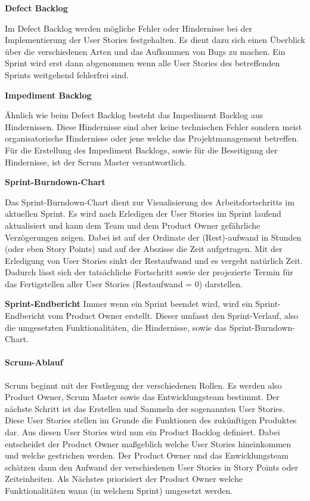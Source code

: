 \textbf{Defect Backlog}

Im Defect Backlog werden mögliche Fehler oder Hindernisse bei der Implementierung der User Stories festgehalten. Es dient dazu sich einen Überblick über die verschiedenen Arten und das Aufkommen von Bugs zu machen. Ein Sprint wird erst dann abgenommen wenn alle User Stories des betreffenden Sprints weitgehend fehlerfrei sind.

\textbf{Impediment Backlog}

Ähnlich wie beim Defect Backlog besteht das Impediment Backlog aus Hindernissen. Diese Hindernisse sind aber keine technischen Fehler sondern meist organisatorische Hindernisse oder jene welche das Projektmanagement betreffen. Für die Erstellung des Impediment Backlogs, sowie für die Beseitigung der Hindernisse, ist der Scrum Master verantwortlich.

\textbf{Sprint-Burndown-Chart}

Das Sprint-Burndown-Chart dient zur Visualisierung des Arbeitsfortschritts im aktuellen Sprint. Es wird nach Erledigen der User Stories im Sprint laufend aktualisiert und kann dem Team und dem Product Owner gefährliche Verzögerungen zeigen. Dabei ist auf der Ordinate der (Rest)-aufwand in Stunden (oder eben Story Points) und auf der Abszisse die Zeit aufgetragen. Mit der Erledigung von User Stories sinkt der Restaufwand und es vergeht natürlich Zeit. Dadurch lässt sich der tatsächliche Fortschritt sowie der projezierte Termin für das Fertigstellen aller User Stories (Restaufwand = 0) darstellen.


\textbf{Sprint-Endbericht}
Immer wenn ein Sprint beendet wird, wird ein Sprint-Endbericht vom Product Owner erstellt. Dieser umfasst den Sprint-Verlauf, also die umgesetzten Funktionalitäten, die Hindernisse, sowie das Sprint-Burndown-Chart.

\paragraph{Scrum-Ablauf}
Scrum beginnt mit der Festlegung der verschiedenen Rollen. Es werden also Product Owner, Scrum Master sowie das Entwicklungsteam bestimmt. Der nächste Schritt ist das Erstellen und Sammeln der sogenannten User Stories. Diese User Stories stellen im Grunde die Funktionen des zukünftigen Produktes dar. Aus diesen User Stories wird nun ein Product Backlog definiert. Dabei entscheidet der Product Owner maßgeblich welche User Stories hineinkommen und welche gestrichen werden. Der Product Owner und das Enwicklungsteam schätzen dann den Aufwand der verschiedenen User Stories in Story Points oder Zeiteinheiten. Als Nächstes priorisiert der Product Owner welche Funktionalitäten wann (in welchem Sprint) umgesetzt werden.

